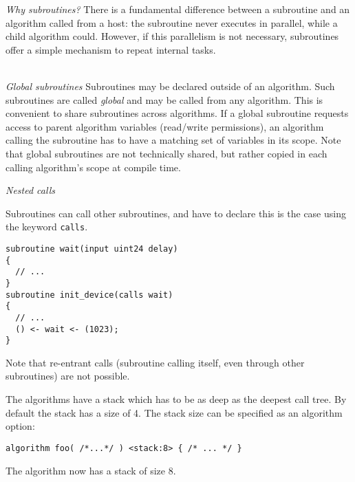 \documentclass[a4]{article}
\begin{document}
\noindent \textit{Why subroutines?} There is a fundamental difference between a subroutine and an algorithm called from 
a host: the subroutine never executes in parallel, while a child algorithm could. However, if this parallelism is not necessary, 
subroutines offer a simple mechanism to repeat internal tasks.\\~

\noindent \textit{Global subroutines} Subroutines may be declared outside of an algorithm. Such subroutines are called \textit{global} and may be called from any algorithm. This is convenient to share subroutines across algorithms. If a global subroutine requests access to parent algorithm variables (read/write permissions), an algorithm calling the subroutine has to have a matching set of variables in its scope. Note that global subroutines are not technically shared, but rather copied in each calling algorithm's scope at compile time.

\noindent \textit{Nested calls}

Subroutines can call other subroutines, and have to declare this is the case using the keyword \texttt{calls}.

\begin{verbatim}
subroutine wait(input uint24 delay)
{
  // ...
}
subroutine init_device(calls wait)
{
  // ...
  () <- wait <- (1023);
}
\end{verbatim}

Note that re-entrant calls (subroutine calling itself, even through other subroutines) are not possible.

The algorithms have a stack which has to be as deep as the deepest call tree. By default the stack has a size of 4. The stack size can be specified as an algorithm option:

\begin{verbatim}
algorithm foo( /*...*/ ) <stack:8> { /* ... */ }
\end{verbatim}

The algorithm now has a stack of size 8.

\vspace*{5mm}
\noindent
{}

\end{document}
